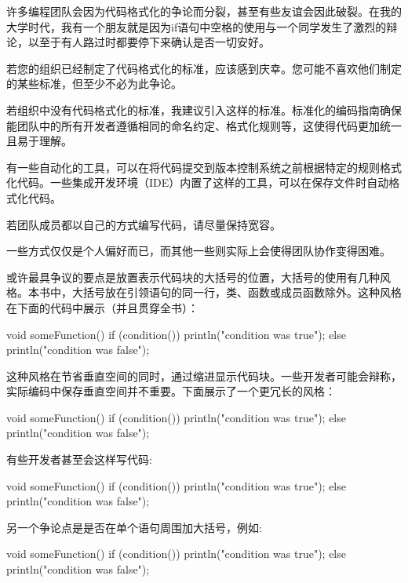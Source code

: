 
许多编程团队会因为代码格式化的争论而分裂，甚至有些友谊会因此破裂。在我的大学时代，我有一个朋友就是因为if语句中空格的使用与一个同学发生了激烈的辩论，以至于有人路过时都要停下来确认是否一切安好。

若您的组织已经制定了代码格式化的标准，应该感到庆幸。您可能不喜欢他们制定的某些标准，但至少不必为此争论。

若组织中没有代码格式化的标准，我建议引入这样的标准。标准化的编码指南确保能团队中的所有开发者遵循相同的命名约定、格式化规则等，这使得代码更加统一且易于理解。

有一些自动化的工具，可以在将代码提交到版本控制系统之前根据特定的规则格式化代码。一些集成开发环境（IDE）内置了这样的工具，可以在保存文件时自动格式化代码。

若团队成员都以自己的方式编写代码，请尽量保持宽容。

一些方式仅仅是个人偏好而已，而其他一些则实际上会使得团队协作变得困难。


或许最具争议的要点是放置表示代码块的大括号的位置，大括号的使用有几种风格。本书中，大括号放在引领语句的同一行，类、函数或成员函数除外。这种风格在下面的代码中展示（并且贯穿全书）：

\begin{cpp}
void someFunction()
{
    if (condition()) {
        println("condition was true");
    } else {
        println("condition was false");
    }
}
\end{cpp}

这种风格在节省垂直空间的同时，通过缩进显示代码块。一些开发者可能会辩称，实际编码中保存垂直空间并不重要。下面展示了一个更冗长的风格：

\begin{cpp}
void someFunction()
{
    if (condition())
    {
        println("condition was true");
    }
    else
    {
        println("condition was false");
    }
}
\end{cpp}

有些开发者甚至会这样写代码:

\begin{cpp}
void someFunction()
{
    if (condition())
        {
            println("condition was true");
        }
    else
        {
            println("condition was false");
        }
}
\end{cpp}

另一个争论点是是否在单个语句周围加大括号，例如:

\begin{cpp}
void someFunction()
{
    if (condition())
        println("condition was true");
    else
        println("condition was false");
}
\end{cpp}

